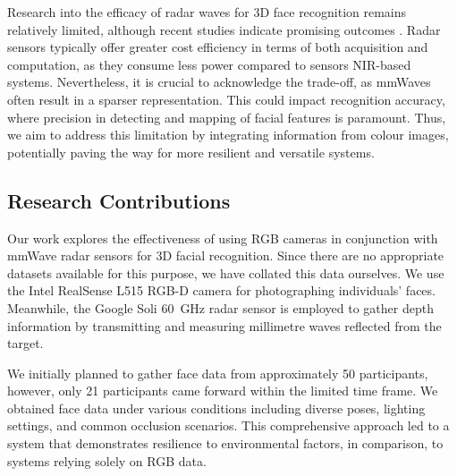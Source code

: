 \documentclass{mpaper}
\begin{document}
Research into the efficacy of radar waves for 3D face recognition remains relatively limited, although recent studies indicate promising outcomes \cite{hof2020face, lim2020dnn,kim2020face, pho2021radar, challa2021face}. Radar sensors typically offer greater cost efficiency in terms of both acquisition and computation, as they consume less power compared to sensors NIR-based systems. Nevertheless, it is crucial to acknowledge the trade-off, as mmWaves often result in a sparser representation. This could impact recognition accuracy, where precision in detecting and mapping of facial features is paramount. Thus, we aim to address this limitation by integrating information from colour images, potentially paving the way for more resilient and versatile systems.


\subsection{Research Contributions}
Our work explores the effectiveness of using RGB cameras in conjunction with mmWave radar sensors for 3D facial recognition. Since there are no appropriate datasets available for this purpose, we have collated this data ourselves. We use the Intel RealSense L515 RGB-D camera \cite{intel-l515} for photographing individuals' faces. Meanwhile, the Google Soli \qty{60}{\GHz} radar sensor \cite{lien2016soli} is employed to gather depth information by transmitting and measuring millimetre waves reflected from the target.

We initially planned to gather face data from approximately \num{50} participants, however, only \num{21} participants came forward within the limited time frame. We obtained face data under various conditions including diverse poses, lighting settings, and common occlusion scenarios. This comprehensive approach led to a system that demonstrates resilience to environmental factors, in comparison, to systems relying solely on RGB data.
\end{document}
